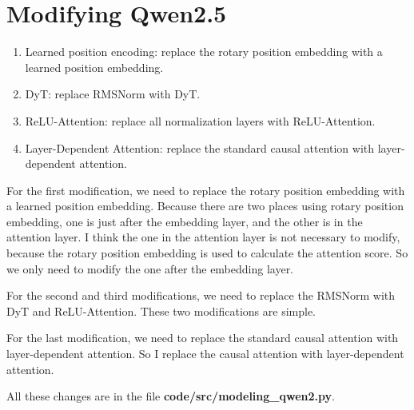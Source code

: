 \documentclass[a4paper,12pt]{article}
\begin{document}
\section{Modifying Qwen2.5}

\begin{enumerate}
    \item Learned position encoding: replace the rotary position embedding with a learned position embedding.
    \item DyT: replace RMSNorm with DyT.
    \item ReLU-Attention: replace all normalization layers with ReLU-Attention.
    \item Layer-Dependent Attention: replace the standard causal attention with layer-dependent attention.
\end{enumerate}

For the first modification, we need to replace the rotary position embedding with a learned position embedding. Because there are two places using rotary position embedding, one is just after the embedding layer, and the other is in the attention layer. I think the one in the attention layer is not necessary to modify, because the rotary position embedding is used to calculate the attention score. So we only need to modify the one after the embedding layer.

For the second and third modifications, we need to replace the RMSNorm with DyT and ReLU-Attention. These two modifications are simple.

For the last modification, we need to replace the standard causal attention with layer-dependent attention. So I replace the causal attention with layer-dependent attention. 

All these changes are in the file \textbf{code/src/modeling_qwen2.py}.


\printbibliography[heading=bibintoc, title={References}]
\end{document}
